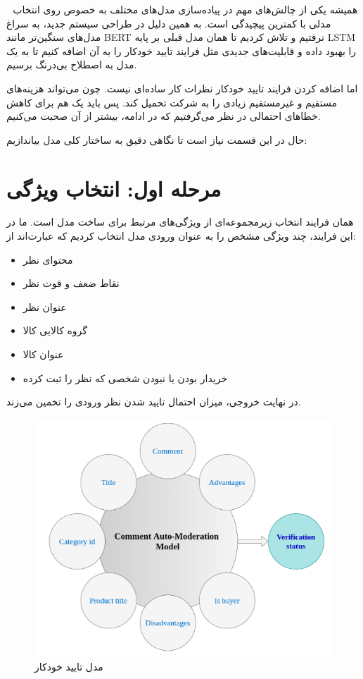

‌
‌
همیشه یکی از چالش‌های مهم در پیاده‌سازی مدل‌های مختلف به خصوص روی 
انتخاب مدلی با کمترین پیچیدگی است. به همین دلیل در طراحی سیستم جدید، به سراغ مدل‌های سنگین‌تر مانند
BERT
نرفتیم  و تلاش کردیم تا همان مدل قبلی بر پایه LSTM‌ را بهبود داده و قابلیت‌های جدیدی مثل فرایند تایید خودکار را به آن اضافه کنیم تا به یک مدل به اصطلاح بی‌درنگ برسیم.

اما اضافه کردن فرایند تایید خودکار نظرات کار ساده‌ای نیست. چون می‌تواند هزینه‌های مستقیم و غیرمستقیم زیادی را به شرکت تحمیل کند. پس باید یک 
هم برای کاهش خطاهای احتمالی در نظر می‌گرفتیم که در ادامه، بیشتر از آن صحبت می‌کنیم.

حال در این قسمت نیاز است تا نگاهی دقیق به ساختار کلی مدل بیاندازیم:

\section{مرحله اول: انتخاب ویژگی}

همان فرایند انتخاب زیرمجموعه‌ای از ویژگی‌های مرتبط برای ساخت مدل است. ما در این فرایند، چند ویژگی مشخص را به عنوان ورودی مدل انتخاب کردیم که عبارت‌اند از:

\begin{itemize}
    \item محتوای نظر
    \item نقاط ضعف و قوت نظر
    \item عنوان نظر
    \item گروه کالایی کالا
    \item عنوان کالا
    \item خریدار بودن یا نبودن شخصی که نظر را ثبت کرده

\end{itemize}

در نهایت خروجی، میزان احتمال تایید شدن نظر ورودی را تخمین می‌زند.

\begin{figure}[H]
\centering
\includegraphics[width=15cm]{figs/auto_moderation_model.png}
\caption{مدل تایید خودکار}\label{}
\label{fig:test}
\end{figure}

